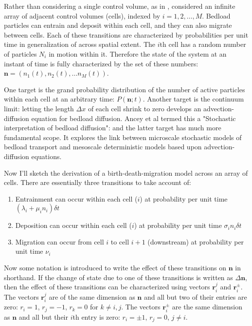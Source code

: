 Rather than considering a single control volume, as in \citet{Ancey2008}, \citet{Ancey2014,Ancey2015} considered an infinite array of adjacent control volumes (cells), indexed by $i=1,2,\dots,M$. 
Bedload particles can entrain and deposit within each cell, and they can also migrate between cells. 
Each of these transitions are characterized by probabilities per unit time in generalization of \citet{Ancey2008} across spatial extent. 
The $i$th cell has a random number of particles $N_i$ in motion within it. 
Therefore the state of the system at an instant of time is fully characterized by the set of these numbers: $\textbf{n} = (n_1(t), n_2(t), \dots n_M(t))$. 

One target is the grand probability distribution of the number of active particles within each cell at an arbitrary time: $P(\textbf{n};t)$. 
Another target is the continuum limit: letting the length $\Delta x$ of each cell shrink to zero develops an advection-diffusion equation for bedload diffusion. 
Ancey et al termed this a "Stochastic interpretation of bedload diffusion": and the latter target has much more fundamental scope.
It explores the link between microscale stochastic models of bedload transport and mesoscale deterministic models based upon advection-diffusion equations. 

Now I'll sketch the \citet{Ancey2014, Ancey2015} derivation of a birth-death-migration model across an array of cells. 
There are essentially three transitions to take account of: 
\begin{enumerate}
\item Entrainment can occur within each cell ($i$) at probability per unit time $(\lambda_i + \mu_i n_i ) \delta t$
\item Deposition can occur within each cell ($i$) at probability per unit time $ \sigma_i n_i \delta t$
\item Migration can occur from cell $i$ to cell $i+1$ (downstream) at probability per unit time $\nu_i$
\end{enumerate} 
Now some notation is introduced to write the effect of these transitions on $\textbf{n}$ in shorthand. 
If the change of state due to one of these transitions is written as $\Delta \textbf{n}$, then the effect of these transitions can be characterized using vectors $\textbf{r}_i^j$ and $\textbf{r}_i^\pm$. The vectors $ \textbf{r}_i^j$ are of the same dimension as $\textbf{n}$ and all but two of their entries are zero: $r_i = 1$, $r_j = -1$, $r_k=0$ for $k\neq i,j$. The vectors $\textbf{r}_i^\pm$ are the same dimension as $\textbf{n}$ and all but their $i$th entry is zero: $r_i = \pm 1$, $r_j = 0$, $j\neq i$. 

